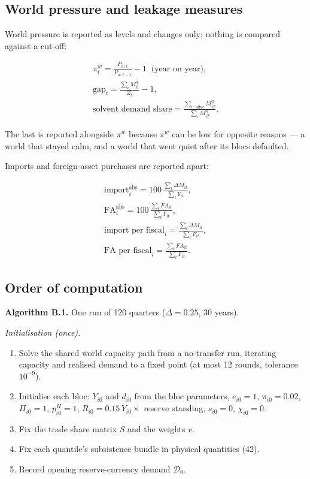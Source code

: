 \documentclass[preprint,review,12pt]{elsarticle}
\providecommand{\tightlist}{%
  \setlength{\itemsep}{0pt}\setlength{\parskip}{0pt}}
\begin{document}
\subsection{World pressure and leakage measures}

World pressure is reported as levels and changes only; nothing is
compared against a cut-off:

\[\begin{gathered} \pi^w_t = \frac{P_{w,t}}{P_{w,t-1}} - 1 \;\; \text{(year on year)}, \\ \mathrm{gap}_t = \frac{\sum_i M^{\mathrm{q}}_{it}}{Z_t} - 1, \\ \text{solvent demand share} = \frac{\sum_{i \,:\, \mathrm{alive}} M^{\mathrm{q}}_{iT}}{\sum_i M^{\mathrm{q}}_{iT}}. \end{gathered} \tag{B.12}\]

The last is reported alongside \(\pi^w\) because \(\pi^w\) can be low
for opposite reasons --- a world that stayed calm, and a world that went
quiet after its blocs defaulted.

Imports and foreign-asset purchases are reported apart:

\[\begin{gathered} \mathrm{import}^{\mathrm{abs}}_i = 100 \, \frac{\sum_t \Delta M_{it}}{\sum_t Y_{it}}, \\ \mathrm{FA}^{\mathrm{abs}}_i = 100 \, \frac{\sum_t FA_{it}}{\sum_t Y_{it}}, \\ \text{import per fiscal}_i = \frac{\sum_t \Delta M_{it}}{\sum_t F_{it}}, \\ \text{FA per fiscal}_i = \frac{\sum_t FA_{it}}{\sum_t F_{it}}. \end{gathered} \tag{B.13}\]

\subsection{Order of computation}

\textbf{Algorithm B.1.} One run of 120 quarters (\(\Delta = 0.25\), 30
years).

\emph{Initialisation (once).}

\begin{enumerate}
\def\labelenumi{\arabic{enumi}.}
\tightlist
\item
  Solve the shared world capacity path from a no-transfer run, iterating
  capacity and realised demand to a fixed point (at most 12 rounds,
  tolerance \(10^{-9}\)).
\item
  Initialise each bloc: \(Y_{i0}\) and \(d_{i0}\) from the bloc
  parameters, \(e_{i0} = 1\), \(\pi_{i0} = 0.02\), \(\Pi_{i0} = 1\),
  \(p^H_{i0} = 1\), \(R_{i0} = 0.15 \, Y_{i0} \times\) reserve standing,
  \(s_{i0} = 0\), \(\chi_{i0} = 0\).
\item
  Fix the trade share matrix \(S\) and the weights \(v\).
\item
  Fix each quantile's subsistence bundle in physical quantities (42).
\item
  Record opening reserve-currency demand \(\mathcal{D}_0\).
\end{enumerate}
\end{document}
